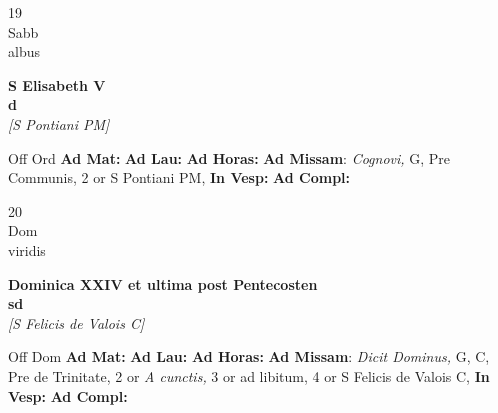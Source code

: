 \documentclass[10pt, openany]{book}
\begin{document}
        \begin{center}
            \begin{minipage}{3.5in}
                \vspace{2em}
                \begin{minipage}{0.5in}
                    {\Huge 19} \\
                    {\normalsize Sabb} \\
                    {\normalsize albus}
                \end{minipage}
                \begin{minipage}{3.0in}
                    \textbf{ \large S Elisabeth V \\
                    \textnormal{\normalsize d}} \\ \textit{[S Pontiani PM]} \\ 
                \end{minipage}
                \begin{justify}Off Ord
                    \textbf{Ad Mat: }
                    \textbf{Ad Lau: }
                    \textbf{Ad Horas: }\textbf{Ad Missam}: \textit{Cognovi,} G, Pre Communis, 2 or S Pontiani PM,  
                    \textbf{In Vesp: }
                    \textbf{Ad Compl: }
                \end{justify}
            \end{minipage}
        \end{center}
    
        \begin{center}
            \begin{minipage}{3.5in}
                \vspace{2em}
                \begin{minipage}{0.5in}
                    {\Huge 20} \\
                    {\normalsize Dom} \\
                    {\normalsize viridis}
                \end{minipage}
                \begin{minipage}{3.0in}
                    \textbf{ \large Dominica XXIV et ultima post Pentecosten \\
                    \textnormal{\normalsize sd}} \\ \textit{[S Felicis de Valois C]} \\ 
                \end{minipage}
                \begin{justify}Off Dom
                    \textbf{Ad Mat: }
                    \textbf{Ad Lau: }
                    \textbf{Ad Horas: }\textbf{Ad Missam}: \textit{Dicit Dominus,} G, C, Pre de Trinitate, 2 or \textit{A cunctis,} 3 or ad libitum, 4 or S Felicis de Valois C,  
                    \textbf{In Vesp: }
                    \textbf{Ad Compl: }
                \end{justify}
            \end{minipage}
        \end{center}
    
\end{document}
